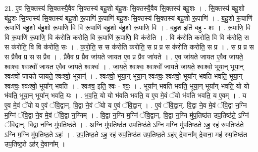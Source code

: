 \documentclass[17pt]{extarticle}
\begin{document}
21. ए॒व सि॒क्तस्य॑ सि॒क्तस्यै॒वैव सि॒क्तस्य॑ बहु॒शो ब॑हु॒शः सि॒क्तस्यै॒वैव सि॒क्तस्य॑ बहु॒शः । . सि॒क्तस्य॑ बहु॒शो ब॑हु॒शः सि॒क्तस्य॑ सि॒क्तस्य॑ बहु॒शो रू॒पाणि॑ रू॒पाणि॑ बहु॒शः सि॒क्तस्य॑ सि॒क्तस्य॑ बहु॒शो रू॒पाणि॑ । . ब॒हु॒शो रू॒पाणि॑ रू॒पाणि॑ बहु॒शो ब॑हु॒शो रू॒पाणि॒ वि वि रू॒पाणि॑ बहु॒शो ब॑हु॒शो रू॒पाणि॒ वि । . ब॒हु॒श इति॑ बहु - शः । . रू॒पाणि॒ वि वि रू॒पाणि॑ रू॒पाणि॒ वि क॑रोति करोति॒ वि रू॒पाणि॑ रू॒पाणि॒ वि क॑रोति । . वि क॑रोति करोति॒ वि वि क॑रोति॒ स स क॑रोति॒ वि वि क॑रोति॒ सः । . क॒रो॒ति॒ स स क॑रोति करोति॒ स प्र प्र स क॑रोति करोति॒ स प्र । . स प्र प्र स स प्रैवैव प्र स स प्रैव । . प्रैवैव प्र प्रैव जा॑यते जायत ए॒व प्र प्रैव जा॑यते । . ए॒व जा॑यते जायत ए॒वैव जा॑यते॒ श्वःश्वः॒ श्वःश्वो॑ जायत ए॒वैव जा॑यते॒ श्वःश्वः॑ । . जा॒य॒ते॒ श्वःश्वः॒ श्वःश्वो॑ जायते जायते॒ श्वःश्वो॒ भूया॒न् भूया॒न् श्वःश्वो॑ जायते जायते॒ श्वःश्वो॒ भूयान्॑ । . श्वःश्वो॒ भूया॒न् भूया॒न् श्वःश्वः॒ श्वःश्वो॒ भूया᳚न् भवति भवति॒ भूया॒न् श्वःश्वः॒ श्वःश्वो॒ भूया᳚न् भवति । . श्वःश्व॒ इति॒ श्वः - श्वः॒ । . भूया᳚न् भवति भवति॒ भूया॒न् भूया᳚न् भवति॒ यो यो भ॑वति॒ भूया॒न् भूया᳚न् भवति॒ यः । . भ॒व॒ति॒ यो यो भ॑वति भवति॒ य ए॒व मे॒वं ॅयो भ॑वति भवति॒ य ए॒वम् । . य ए॒व मे॒वं ॅयो य ए॒वं ॅवि॒द्वान्. वि॒द्वा ने॒वं ॅयो य ए॒वं ॅवि॒द्वान् । . ए॒वं ॅवि॒द्वान्. वि॒द्वा ने॒व मे॒वं ॅवि॒द्वा न॒ग्नि म॒ग्निं ॅवि॒द्वा ने॒व मे॒वं ॅवि॒द्वा न॒ग्निम् । . वि॒द्वा न॒ग्नि म॒ग्निं ॅवि॒द्वान्. वि॒द्वा न॒ग्नि मु॑प॒तिष्ठ॑त उप॒तिष्ठ॑ते॒ ऽग्निं ॅवि॒द्वान्. वि॒द्वा न॒ग्नि मु॑प॒तिष्ठ॑ते । . अ॒ग्नि मु॑प॒तिष्ठ॑त उप॒तिष्ठ॑ते॒ ऽग्नि म॒ग्नि मु॑प॒तिष्ठ॒ते ऽह॒ रह॑ रुप॒तिष्ठ॑ते॒ ऽग्नि म॒ग्नि मु॑प॒तिष्ठ॒ते ऽहः॑ । . उ॒प॒तिष्ठ॒ते ऽह॒ रह॑ रुप॒तिष्ठ॑त उप॒तिष्ठ॒ते ऽह॑र् दे॒वाना᳚म् दे॒वाना॒ मह॑ रुप॒तिष्ठ॑त उप॒तिष्ठ॒ते ऽह॑र् दे॒वाना᳚म् । \newline
\end{document}
